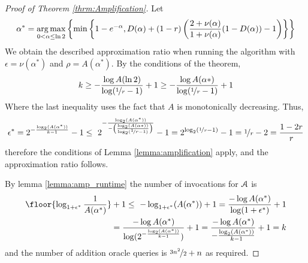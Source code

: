\documentclass[a4paper,UKenglish,cleveref, autoref]{lipics-v2019}
\begin{document}
\begin{proof}[Proof of Theorem \ref{thrm:Amplification}]
	Let $$\alpha^*  = \operatorname*{arg\,max} _{0<\alpha \leq \ln{2}} \left\{ \min \left\{ 1-e^{-\alpha},D(\alpha)+(1-r)\left( \frac{2+\nu(\alpha)}{1+\nu(\alpha)} (1-D(\alpha)) -1\right)\right\}\right\}$$
	We obtain the described approximation ratio when running the algorithm
	with $\epsilon = \nu(\alpha^*)$ and $\rho = A(\alpha^*)$.
	By the conditions of the theorem,
	$$k \geq -\frac{\log A(\ln 2)} { \log(\nicefrac[]{1}{r} -1 ) } +1 \geq-\frac{\log A(\alpha*)} { \log(\nicefrac[]{1}{r} -1 ) } +1 $$
	Where the last inequality uses the fact that $A$ is monotonically decreasing.  Thus,
	$$\epsilon^* = 2 ^{-\frac{\log_2 (A(\alpha^*))}{k-1}} -1 \leq \
	2 ^{-\frac{ \log_2(A(\alpha^*))}{  -\left(\frac{\log_2(A(\alpha* ))}{\log_2(\nicefrac[]{1}{r}-1)} \right) }} -1  =
	2^{\log_2(\nicefrac[]{1}{r}-1)} -1 = \nicefrac[]{1}{r}-2 = \frac{1-2r}{r} $$
	therefore the conditions of Lemma \ref{lemma:amplification} apply,
	and the approximation ratio follows.
	
	By lemma \ref{lemma:amp_runtime} the number of invocations for $\mathcal{A}$
	is
	\begin{align*}
	\floor{\log_{1+\epsilon^*} \frac{1}{A(\alpha^*)}}+1 \leq \
	-\log_{1+\epsilon^*} (A(\alpha^*)) +1 =
	\frac{-\log A(\alpha^*)} {\log(1+\epsilon^*)} +1 \\
	= \frac{-\log {A(\alpha^*)}} {\log(2 ^{-\frac{\log_2 (A(\alpha^*))}{k-1}} )} +1
	= \frac{-\log {A(\alpha^*)}} {-\frac{\log_2 (A(\alpha^*))}{k-1}} +1
	= k \end{align*}
	and the number of addition oracle queries is $\nicefrac[]{3n^2}{2} + n $
	as required.
	
\end{proof}






\appendix
\end{document}
